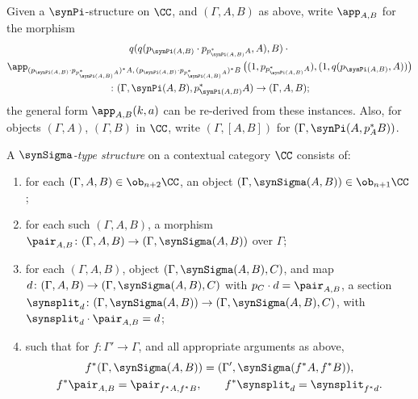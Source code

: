 Given a $\synPi$-structure on $\CC$, and $(\Gamma,A,B)$ as above, write $\app_{A,B}$ for the morphism 
\begin{multline*}
  q(q(p_{\synPi(A,B)} \cdot p_{p_{\synPi(A,B)}^*A},A),B) \cdot {} \\
  \app_{(p_{\synPi(A,B)} \cdot p_{p_{\synPi(A,B)}^*A})^* A,\, (p_{\synPi(A,B)} \cdot p_{p_{\synPi(A,B)}^*A})^* B}\, \big( (1,p_{p_{\synPi(A,B)}^*A}) , (1, q(p_{\synPi(A,B)},A)) \big) \\
  \colon (\Gamma,\synPi(A,B),p_{\synPi(A,B)}^*A) \to (\Gamma,A,B);
\end{multline*}
the general form $\app_{A,B}(k,a)$ can be re-derived from these instances.  Also, for objects $(\Gamma,A)$, $(\Gamma,B)$ in $\CC$, write $(\Gamma,[A,B])$ for $(\Gamma, \synPi(A,p_A^*B))$.

\begin{definition}
A \emph{$\synSigma$-type structure} on a contextual category $\CC$ consists of:
\begin{enumerate}
  \item for each $(\Gamma, A, B) \in \ob_{n+2} \CC$, an object $(\Gamma, \synSigma(A, B)) \in \ob_{n+1} \CC$;
  \item for each such $(\Gamma,A,B)$, a morphism $\pair_{A,B} \colon (\Gamma,A,B) \to (\Gamma, \synSigma(A,B))$ over $\Gamma$;
  \item for each $(\Gamma,A,B)$, object $(\Gamma, \synSigma(A,B), C)$, and map $d \colon (\Gamma,A,B) \to (\Gamma, \synSigma(A,B), C)$ with $p_C \cdot d = \pair_{A,B}$, a section $\synsplit_d \colon (\Gamma,\synSigma(A,B)) \to (\Gamma, \synSigma(A,B), C)$, with $\synsplit_d \cdot \pair_{A,B} = d$;
\item such that for $f \colon \Gamma' \to \Gamma$, and all appropriate arguments as above,
   \begin{gather*}
     f^*(\Gamma, \synSigma(A, B)) = (\Gamma', \synSigma(f^*A, f^*B)), \\
     f^*\pair_{A,B} = \pair_{f^*A,f^*B}, \qquad f^*\synsplit_d = \synsplit_{f^*d}.
   \end{gather*}
 \end{enumerate}
\end{definition}

